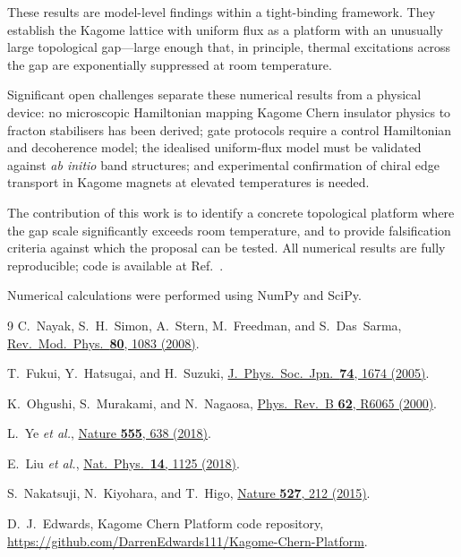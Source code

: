 \documentclass[aps,prb,twocolumn,superscriptaddress,floatfix]{revtex4-2}
\begin{document}
These results are model-level findings within a tight-binding framework. They establish the Kagome lattice with uniform flux as a platform with an unusually large topological gap---large enough that, in principle, thermal excitations across the gap are exponentially suppressed at room temperature.

Significant open challenges separate these numerical results from a physical device: no microscopic Hamiltonian mapping Kagome Chern insulator physics to fracton stabilisers has been derived; gate protocols require a control Hamiltonian and decoherence model; the idealised uniform-flux model must be validated against \textit{ab initio} band structures; and experimental confirmation of chiral edge transport in Kagome magnets at elevated temperatures is needed.

The contribution of this work is to identify a concrete topological platform where the gap scale significantly exceeds room temperature, and to provide falsification criteria against which the proposal can be tested. All numerical results are fully reproducible; code is available at Ref.~.

\begin{acknowledgments}
Numerical calculations were performed using NumPy and SciPy.
\end{acknowledgments}

\begin{thebibliography}{9}
C.~Nayak, S.~H.~Simon, A.~Stern, M.~Freedman, and S.~Das~Sarma,
\href{https://doi.org/10.1103/RevModPhys.80.1083}{Rev.\ Mod.\ Phys.\ \textbf{80}, 1083 (2008)}.

T.~Fukui, Y.~Hatsugai, and H.~Suzuki,
\href{https://doi.org/10.1143/JPSJ.74.1674}{J.\ Phys.\ Soc.\ Jpn.\ \textbf{74}, 1674 (2005)}.

K.~Ohgushi, S.~Murakami, and N.~Nagaosa,
\href{https://doi.org/10.1103/PhysRevB.62.R6065}{Phys.\ Rev.\ B \textbf{62}, R6065 (2000)}.

L.~Ye \textit{et al.},
\href{https://doi.org/10.1038/nature25987}{Nature \textbf{555}, 638 (2018)}.

E.~Liu \textit{et al.},
\href{https://doi.org/10.1038/s41567-018-0234-5}{Nat.\ Phys.\ \textbf{14}, 1125 (2018)}.

S.~Nakatsuji, N.~Kiyohara, and T.~Higo,
\href{https://doi.org/10.1038/nature15723}{Nature \textbf{527}, 212 (2015)}.

D.~J.~Edwards, Kagome Chern Platform code repository,
\url{https://github.com/DarrenEdwards111/Kagome-Chern-Platform}.
\end{thebibliography}
\end{document}
